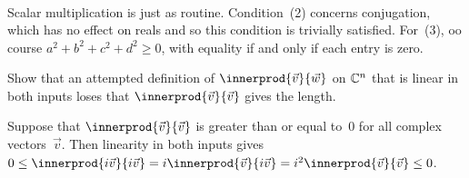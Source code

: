 \begin{exercises}
\begin{answer}
\begin{multline*}
\end{multline*}
Scalar multiplication is just as routine.
Condition~(2) concerns conjugation, 
which has no effect on reals and 
so this condition is trivially satisfied. 
For~(3), oo course $a^2+b^2+c^2+d^2\geq 0$, with equality if and only
if each entry is zero.
\end{answer}
%
\item
Show that an attempted definition of $\innerprod{\vec{v}}{\vec{w}}$
on $\mathbb{C}^n$ that is linear in both inputs
loses that $\innerprod{\vec{v}}{\vec{v}}$ gives the length.
\begin{answer}
Suppose that
$\innerprod{\vec{v}}{\vec{v}}$ is greater than or equal to~$0$ for all
complex vectors~$\vec{v}$.
Then linearity in both inputs gives
$0\leq \innerprod{i\vec{v}}{i\vec{v}}
  =i\innerprod{\vec{v}}{i\vec{v}}
  =i^2\innerprod{\vec{v}}{\vec{v}}\leq 0$.
\end{answer}





\end{exercises}
\endinput
% 